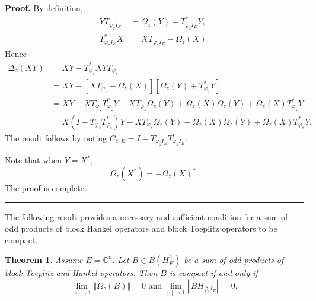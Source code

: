 \documentclass{article}%
\newtheorem{theorem}{Theorem}[section]
\newenvironment{proof}[1][Proof]{\noindent\textbf{#1.} }{\ \rule{0.5em}{0.5em}}
\begin{document}
\begin{proof}
By definition,%
\begin{align*}
YT_{\varphi_{z}I_{E}}  &  =\Omega_{z}(Y)+T_{\varphi_{\overline{z}}I_{E}}%
^{\ast}Y,\\
T_{\varphi_{z}I_{E}}^{\ast}X  &  =XT_{\varphi_{\overline{z}}I_{E}}%
-\Omega_{\overline{z}}(X).
\end{align*}
Hence
\begin{align*}
\Delta_{z}(XY)  &  =XY-T_{\varphi_{z}}^{\ast}XYT_{\varphi_{z}}\\
&  =XY-\left[  XT_{\varphi_{\overline{z}}}-\Omega_{\overline{z}}(X)\right]
\left[  \Omega_{z}(Y)+T_{\varphi_{\overline{z}}}^{\ast}Y\right] \\
&  =XY-XT_{\varphi_{\overline{z}}}T_{\varphi_{\overline{z}}}^{\ast
}Y-XT_{\varphi_{\overline{z}}}\Omega_{z}(Y)+\Omega_{\overline{z}}(X)\Omega
_{z}(Y)+\Omega_{\overline{z}}(X)T_{\varphi_{\overline{z}}}^{\ast}Y\\
&  =X(I-T_{\varphi_{\overline{z}}}T_{\varphi_{\overline{z}}}^{\ast
})Y-XT_{\varphi_{\overline{z}}}\Omega_{z}(Y)+\Omega_{\overline{z}}%
(X)\Omega_{z}(Y)+\Omega_{\overline{z}}(X)T_{\varphi_{\overline{z}}}^{\ast}Y.
\end{align*}
The result follows by noting $C_{\overline{z},E}=I-T_{\varphi_{\overline{z}%
}I_{E}}T_{\varphi_{\overline{z}}I_{E}}^{\ast}.$

Note that when $Y=X^{\ast},$%
\[
\Omega_{z}(X^{\ast})=-\Omega_{\overline{z}}(X)^{\ast}.
\]
The proof is complete.
\end{proof}

The following result provides a necessary and sufficient condition for a sum
of odd products of block Hankel operators and block Toeplitz operators to be compact.

\begin{theorem}
\label{main}Assume $E=\mathbb{C}^{n}.$ Let $B\in B(H_{E}^{2})$ be a sum of odd
products of block Toeplitz and Hankel operators. Then $B$ is compact if and
only if
\begin{equation}
\lim_{\left\vert z\right\vert \rightarrow1}\left\Vert \Omega_{z}(B)\right\Vert
=0\text{ and }\lim_{\left\vert z\right\vert \rightarrow1}\left\Vert
BH_{\overline{\varphi_{\overline{z}}}I_{E}}\right\Vert =0. \label{limit}%
\end{equation}

\end{theorem}
\end{document}
